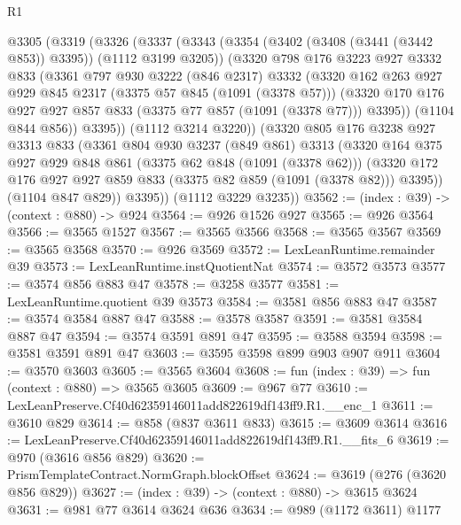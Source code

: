 \begin{lexlean}{R1}
\begin{coremodule}
  @3305
    (@3319
      (@3326
        (@3337
          (@3343
            (@3354 (@3402 (@3408 (@3441 (@3442 @853)) @3395)) (@1112 @3199 @3205))
            (@3320
              @798
              @176
              @3223
              @927
              @3332
              @833
              (@3361
                @797
                @930
                @3222
                (@846 @2317)
                @3332
                (@3320
                  @162
                  @263
                  @927
                  @929
                  @845
                  @2317
                  (@3375 @57 @845 (@1091 (@3378 @57)))
                  (@3320 @170 @176 @927 @927 @857 @833 (@3375 @77 @857 (@1091 (@3378 @77))) @3395))
                (@1104 @844 @856))
              @3395))
          (@1112 @3214 @3220))
        (@3320
          @805
          @176
          @3238
          @927
          @3313
          @833
          (@3361
            @804
            @930
            @3237
            (@849 @861)
            @3313
            (@3320
              @164
              @375
              @927
              @929
              @848
              @861
              (@3375 @62 @848 (@1091 (@3378 @62)))
              (@3320 @172 @176 @927 @927 @859 @833 (@3375 @82 @859 (@1091 (@3378 @82))) @3395))
            (@1104 @847 @829))
          @3395))
      (@1112 @3229 @3235))
@3562 := (index : @39) -> (context : @880) -> @924
@3564 := @926 @1526 @927
@3565 := @926 @3564
@3566 := @3565 @1527
@3567 := @3565 @3566
@3568 := @3565 @3567
@3569 := @3565 @3568
@3570 := @926 @3569
@3572 := LexLeanRuntime.remainder @39
@3573 := LexLeanRuntime.instQuotientNat
@3574 := @3572 @3573
@3577 := @3574 @856 @883 @47
@3578 := @3258 @3577
@3581 := LexLeanRuntime.quotient @39 @3573
@3584 := @3581 @856 @883 @47
@3587 := @3574 @3584 @887 @47
@3588 := @3578 @3587
@3591 := @3581 @3584 @887 @47
@3594 := @3574 @3591 @891 @47
@3595 := @3588 @3594
@3598 := @3581 @3591 @891 @47
@3603 := @3595 @3598 @899 @903 @907 @911
@3604 := @3570 @3603
@3605 := @3565 @3604
@3608 := fun (index : @39) => fun (context : @880) => @3565 @3605
@3609 := @967 @77
@3610 := LexLeanPreserve.Cf40d62359146011add822619df143ff9.R1.__enc_1
@3611 := @3610 @829
@3614 := @858 (@837 @3611 @833)
@3615 := @3609 @3614
@3616 := LexLeanPreserve.Cf40d62359146011add822619df143ff9.R1.__fits_6
@3619 := @970 (@3616 @856 @829)
@3620 := PrismTemplateContract.NormGraph.blockOffset
@3624 := @3619 (@276 (@3620 @856 @829))
@3627 := (index : @39) -> (context : @880) -> @3615 @3624
@3631 := @981 @77 @3614 @3624 @636
@3634 := @989 (@1172 @3611) @1177

\end{coremodule}
\end{lexlean}
